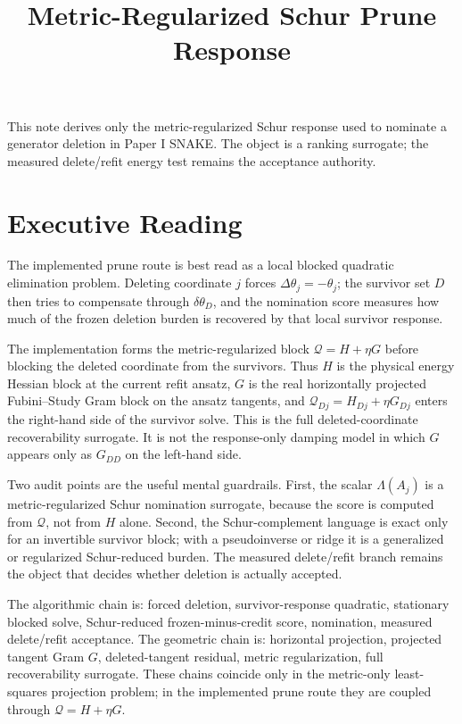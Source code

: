 \documentclass[10pt,twocolumn]{article}
\title{\vspace{-2.2em}Metric-Regularized Schur Prune Response}
\author{}
\date{\vspace{-2.8em}}
\begin{document}
\maketitle
\vspace{-1.5em}

This note derives only the metric-regularized Schur response used to nominate a generator deletion in Paper I SNAKE. The object is a ranking surrogate; the measured delete/refit energy test remains the acceptance authority.

\section*{Executive Reading}

The implemented prune route is best read as a local blocked quadratic elimination problem. Deleting coordinate \(j\) forces \(\Delta\theta_j=-\theta_j\); the survivor set \(D\) then tries to compensate through \(\delta\theta_D\), and the nomination score measures how much of the frozen deletion burden is recovered by that local survivor response.

The implementation forms the metric-regularized block \(\mathcal Q=H+\eta G\) before blocking the deleted coordinate from the survivors. Thus \(H\) is the physical energy Hessian block at the current refit ansatz, \(G\) is the real horizontally projected Fubini--Study Gram block on the ansatz tangents, and \(\mathcal Q_{Dj}=H_{Dj}+\eta G_{Dj}\) enters the right-hand side of the survivor solve. This is the full deleted-coordinate recoverability surrogate. It is not the response-only damping model in which \(G\) appears only as \(G_{DD}\) on the left-hand side.

Two audit points are the useful mental guardrails. First, the scalar \(\Lambda(A_j)\) is a metric-regularized Schur nomination surrogate, because the score is computed from \(\mathcal Q\), not from \(H\) alone. Second, the Schur-complement language is exact only for an invertible survivor block; with a pseudoinverse or ridge it is a generalized or regularized Schur-reduced burden. The measured delete/refit branch remains the object that decides whether deletion is actually accepted.

The algorithmic chain is: forced deletion, survivor-response quadratic, stationary blocked solve, Schur-reduced frozen-minus-credit score, nomination, measured delete/refit acceptance. The geometric chain is: horizontal projection, projected tangent Gram \(G\), deleted-tangent residual, metric regularization, full recoverability surrogate. These chains coincide only in the metric-only least-squares projection problem; in the implemented prune route they are coupled through \(\mathcal Q=H+\eta G\).
\end{document}
